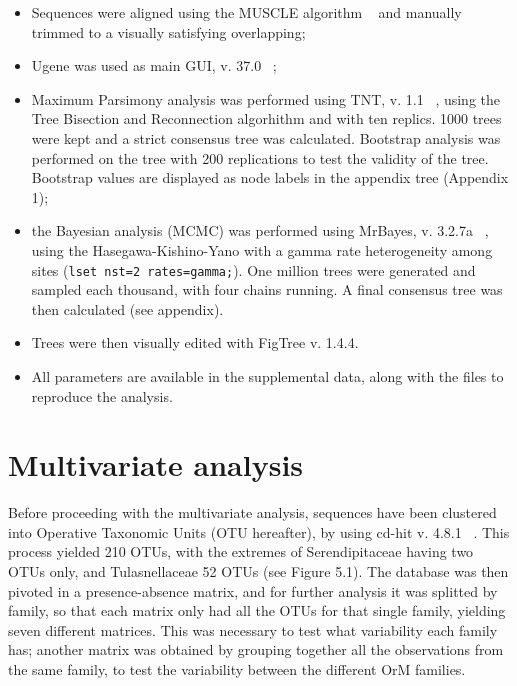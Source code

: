 \begin{itemize}
\item Sequences were aligned using the MUSCLE algorithm ~\citep{edgar2004} and manually trimmed to a visually satisfying overlapping;

\item Ugene was used as main GUI, v. 37.0 ~\citep{okonechnikov2012};

\item Maximum Parsimony analysis was performed using TNT, v. 1.1 ~\citep{tnt}, using the Tree Bisection and Reconnection algorhithm and with ten replics. 1000 trees were kept and a strict consensus tree was calculated. Bootstrap analysis was performed on the tree with 200 replications to test the validity of the tree. Bootstrap values are displayed as node labels in the appendix tree (Appendix 1);

\item the Bayesian analysis (MCMC) was performed using MrBayes, v. 3.2.7a ~\citep{huelsenbeck2001}, using the Hasegawa-Kishino-Yano with a gamma rate heterogeneity among sites (\texttt{lset nst=2 rates=gamma;}). One million trees were generated and sampled each thousand, with four chains running. A final consensus tree was then calculated (see appendix).

\item Trees were then visually edited with FigTree v. 1.4.4.

\item All parameters are available in the supplemental data, along with the files to reproduce the analysis.

\end{itemize}

\chapter{Multivariate analysis}
\label{multivariateanalysis}

Before proceeding with the multivariate analysis, sequences have been clustered into Operative Taxonomic Units (OTU hereafter), by using cd-hit v. 4.8.1 ~\citep{li2001}. This process yielded 210 OTUs, with the extremes of Serendipitaceae having two OTUs only, and Tulasnellaceae 52 OTUs (see Figure 5.1).
The database was then pivoted in a presence-absence matrix, and for further analysis it was splitted by family, so that each matrix only had all the OTUs for that single family, yielding seven different matrices. This was necessary to test what variability each family has; another matrix was obtained by grouping together all the observations from the same family, to test the variability between the different OrM families.


